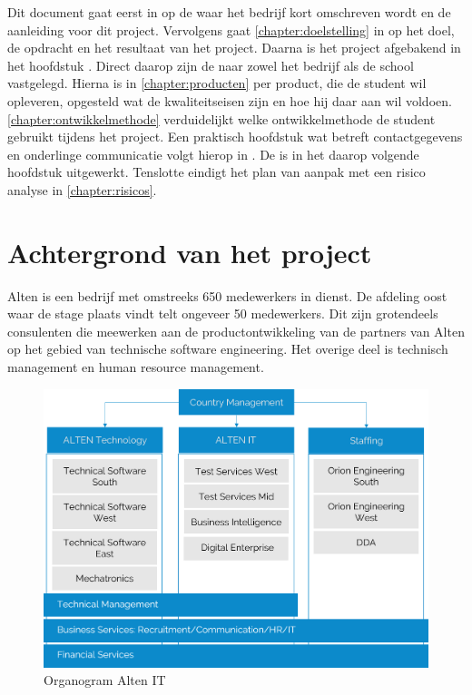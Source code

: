 \documentclass[a4paper, 11pt, oneside]{report}
\begin{document}
Dit document gaat eerst in op de  waar het bedrijf kort omschreven wordt en de aanleiding voor dit project.
Vervolgens gaat \autoref{chapter:doelstelling} in op het doel, de opdracht en het resultaat van het project.
Daarna is het project afgebakend in het hoofdstuk .
Direct daarop zijn de  naar zowel het bedrijf als de school vastgelegd.
Hierna is in \autoref{chapter:producten} per product, die de student wil opleveren, opgesteld wat de kwaliteitseisen zijn en hoe hij daar aan wil voldoen.
\autoref{chapter:ontwikkelmethode} verduidelijkt welke ontwikkelmethode de student gebruikt tijdens het project.
Een praktisch hoofdstuk wat betreft contactgegevens en onderlinge communicatie volgt hierop in .
De  is in het daarop volgende hoofdstuk uitgewerkt.
Tenslotte eindigt het plan van aanpak met een risico analyse in \autoref{chapter:risicos}.



\chapter{Achtergrond van het project}
\label{chapter:achtergrond}
Alten is een bedrijf met omstreeks 650 medewerkers in dienst.
De afdeling oost waar de stage plaats vindt telt ongeveer 50 medewerkers. 
Dit zijn grotendeels consulenten die meewerken aan de productontwikkeling van de partners van Alten op het gebied van technische software engineering.
Het overige deel is technisch management en human resource management.
\begin{figure}[H]
	\begin{center}\includegraphics[scale=0.2]{organogram}\end{center}
	\caption{Organogram Alten IT}
	\label{fig:organogram}
\end{figure}
\end{document}
